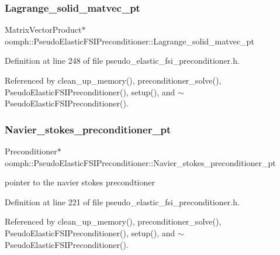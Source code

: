 \subsubsection{\texorpdfstring{Lagrange\+\_\+solid\+\_\+matvec\+\_\+pt}{Lagrange\_solid\_matvec\_pt}}
{\footnotesize\ttfamily Matrix\+Vector\+Product$\ast$ oomph\+::\+Pseudo\+Elastic\+F\+S\+I\+Preconditioner\+::\+Lagrange\+\_\+solid\+\_\+matvec\+\_\+pt\hspace{0.3cm}{\ttfamily [private]}}



Definition at line 248 of file pseudo\+\_\+elastic\+\_\+fsi\+\_\+preconditioner.\+h.



Referenced by clean\+\_\+up\+\_\+memory(), preconditioner\+\_\+solve(), Pseudo\+Elastic\+F\+S\+I\+Preconditioner(), setup(), and $\sim$\+Pseudo\+Elastic\+F\+S\+I\+Preconditioner().

\mbox{\label{classoomph_1_1PseudoElasticFSIPreconditioner_a5314b4734298c3de8f394a45792ba1c9}} 
\subsubsection{\texorpdfstring{Navier\+\_\+stokes\+\_\+preconditioner\+\_\+pt}{Navier\_stokes\_preconditioner\_pt}}
{\footnotesize\ttfamily Preconditioner$\ast$ oomph\+::\+Pseudo\+Elastic\+F\+S\+I\+Preconditioner\+::\+Navier\+\_\+stokes\+\_\+preconditioner\+\_\+pt\hspace{0.3cm}{\ttfamily [private]}}



pointer to the navier stokes precondtioner 



Definition at line 221 of file pseudo\+\_\+elastic\+\_\+fsi\+\_\+preconditioner.\+h.



Referenced by clean\+\_\+up\+\_\+memory(), preconditioner\+\_\+solve(), Pseudo\+Elastic\+F\+S\+I\+Preconditioner(), setup(), and $\sim$\+Pseudo\+Elastic\+F\+S\+I\+Preconditioner().

